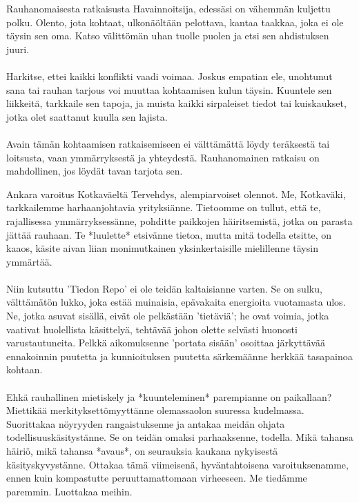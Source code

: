\documentclass[a4paper,12pt]{article}
\begin{document}
\begin{biginfobox}{Rauhanomaisesta ratkaisusta}
Havainnoitsija, edessäsi on vähemmän kuljettu polku. Olento, jota kohtaat, ulkonäöltään pelottava, kantaa taakkaa, joka ei ole täysin sen oma. Katso välittömän uhan tuolle puolen ja etsi sen ahdistuksen juuri.\\
\\
Harkitse, ettei kaikki konflikti vaadi voimaa. Joskus empatian ele, unohtunut sana tai rauhan tarjous voi muuttaa kohtaamisen kulun täysin. Kuuntele sen liikkeitä, tarkkaile sen tapoja, ja muista kaikki sirpaleiset tiedot tai kuiskaukset, jotka olet saattanut kuulla sen lajista.\\
\\
Avain tämän kohtaamisen ratkaisemiseen ei välttämättä löydy teräksestä tai loitsusta, vaan ymmärryksestä ja yhteydestä. Rauhanomainen ratkaisu on mahdollinen, jos löydät tavan tarjota sen.
\end{biginfobox}

\begin{biginfobox}{Ankara varoitus Kotkaväeltä}
Tervehdys, alempiarvoiset olennot. Me, Kotkaväki, tarkkailemme harhaanjohtavia yrityksiänne. Tietoomme on tullut, että te, rajallisessa ymmärryksessänne, pohditte paikkojen häiritsemistä, jotka on parasta jättää rauhaan. Te *luulette* etsivänne tietoa, mutta mitä todella etsitte, on kaaos, käsite aivan liian monimutkainen yksinkertaisille mielillenne täysin ymmärtää.\\
\\
Niin kutsuttu 'Tiedon Repo' ei ole teidän kaltaisianne varten. Se on sulku, välttämätön lukko, joka estää muinaisia, epävakaita energioita vuotamasta ulos. Ne, jotka asuvat sisällä, eivät ole pelkästään 'tietäviä'; he ovat voimia, jotka vaativat huolellista käsittelyä, tehtävää johon olette selvästi huonosti varustautuneita. Pelkkä aikomuksenne 'portata sisään' osoittaa järkyttävää ennakoinnin puutetta ja kunnioituksen puutetta särkemäänne herkkää tasapainoa kohtaan.\\
\\
Ehkä rauhallinen mietiskely ja *kuunteleminen* parempianne on paikallaan? Miettikää merkityksettömyyttänne olemassaolon suuressa kudelmassa. Suorittakaa nöyryyden rangaistuksenne ja antakaa meidän ohjata todellisuuskäsitystänne. Se on teidän omaksi parhaaksenne, todella. Mikä tahansa häiriö, mikä tahansa *avaus*, on seurauksia kaukana nykyisestä käsityskyvystänne. Ottakaa tämä viimeisenä, hyväntahtoisena varoituksenamme, ennen kuin kompastutte peruuttamattomaan virheeseen. Me tiedämme paremmin. Luottakaa meihin.
\end{biginfobox}
\end{document}
